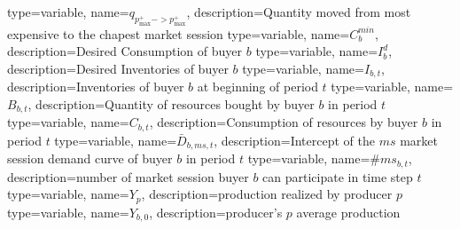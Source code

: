{%
  type=variable,%
  name={$q_{p^+_{\max} -> p^+_{\max}}$},%
  description={Quantity moved from most expensive to the chapest market session} 
}
{%
  type=variable,%
  name={$C^{min}_b$},%
  description={Desired Consumption of buyer $b$} 
}
{%
  type=variable,%
  name={$I^d_b$},%
  description={Desired Inventories of buyer $b$} 
}
{%
  type=variable,%
  name={$I_{b,t}$},%
  description={Inventories of buyer $b$ at beginning of period $t$} 
}
{%
  type=variable,%
  name={$B_{b,t}$},%
  description={Quantity of resources bought by buyer $b$ in period $t$} 
}
{%
  type=variable,%
  name={$C_{b,t}$},%
  description={Consumption of resources by buyer $b$ in period $t$} 
}
{%
  type=variable,%
  name={$\bar{D}_{b,ms,t}$},%
  description={Intercept of the $ms$ market session demand curve of buyer $b$ in period $t$} 
}
{%
  type=variable,%
  name={$\#ms_{b,t}$},%
  description={number of market session buyer $b$ can participate in time step $t$} 
}
{%
  type=variable,%
  name={$Y_{p}$},%
  description={production realized by producer $p$} 
}
{%
  type=variable,%
  name={$Y_{b,0}$},%
  description={producer's $p$ average production} 
}


